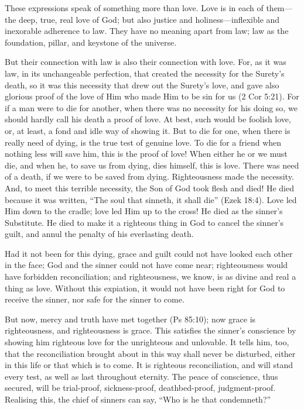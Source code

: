\documentclass[
]{book}
\begin{document}
These expressions speak of something more than love. Love is in each of them---the deep, true, real love of God; but also justice and holiness---inflexible and inexorable adherence to law. They have no meaning apart from law; law as the foundation, pillar, and keystone of the universe.

But their connection with law is also their connection with love. For, as it was law, in its unchangeable perfection, that created the necessity for the Surety's death, so it was this necessity that drew out the Surety's love, and gave also glorious proof of the love of Him who made Him to be sin for us (2 Cor 5:21). For if a man were to die for another, when there was no necessity for his doing so, we should hardly call his death a proof of love. At best, such would be foolish love, or, at least, a fond and idle way of showing it. But to die for one, when there is really need of dying, is the true test of genuine love. To die for a friend when nothing less will save him, this is the proof of love! When either he or we must die, and when he, to save us from dying, dies himself, this is love. There was need of a death, if we were to be saved from dying. Righteousness made the necessity. And, to meet this terrible necessity, the Son of God took flesh and died! He died because it was written, ``The soul that sinneth, it shall die'' (Ezek 18:4). Love led Him down to the cradle; love led Him up to the cross! He died as the sinner's Substitute. He died to make it a righteous thing in God to cancel the sinner's guilt, and annul the penalty of his everlasting death.

Had it not been for this dying, grace and guilt could not have looked each other in the face; God and the sinner could not have come near; righteousness would have forbidden reconciliation; and righteousness, we know, is as divine and real a thing as love. Without this expiation, it would not have been right for God to receive the sinner, nor safe for the sinner to come.

But now, mercy and truth have met together (Ps 85:10); now grace is righteousness, and righteousness is grace. This satisfies the sinner's conscience by showing him righteous love for the unrighteous and unlovable. It tells him, too, that the reconciliation brought about in this way shall never be disturbed, either in this life or that which is to come. It is righteous reconciliation, and will stand every test, as well as last throughout eternity. The peace of conscience, thus secured, will be trial-proof, sickness-proof, deathbed-proof, judgment-proof. Realising this, the chief of sinners can say, ``Who is he that condemneth?''
\end{document}
